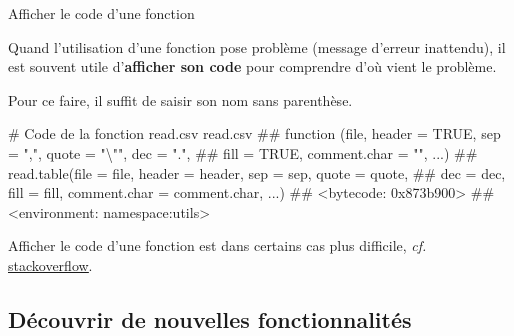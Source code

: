 \documentclass[12pt,handout,ignorenonframetext,]{beamer}
\newenvironment{Shaded}{}{}
\newcommand{\CommentTok}[1]{\textcolor[rgb]{0.00,0.50,0.00}{#1}}
\newcommand{\NormalTok}[1]{#1}
\renewenvironment{Shaded}{\begin{snugshade}}{\end{snugshade}}
\begin{document}
\begin{frame}[fragile]{Afficher le code d'une fonction}

Quand l'utilisation d'une fonction pose problème (message d'erreur
inattendu), il est souvent utile d'\textbf{afficher son code} pour
comprendre d'où vient le problème.

\pause Pour ce faire, il suffit de saisir son nom sans parenthèse.

\footnotesize

\begin{Shaded}
\begin{Highlighting}[]
\CommentTok{# Code de la fonction read.csv}
\NormalTok{read.csv}
\NormalTok{  ## function (file, header = TRUE, sep = ",", quote = "\textbackslash{}"", dec = ".", }
\NormalTok{  ##     fill = TRUE, comment.char = "", ...) }
\NormalTok{  ## read.table(file = file, header = header, sep = sep, quote = quote, }
\NormalTok{  ##     dec = dec, fill = fill, comment.char = comment.char, ...)}
\NormalTok{  ## <bytecode: 0x873b900>}
\NormalTok{  ## <environment: namespace:utils>}
\end{Highlighting}
\end{Shaded}

\pause \normalsize
Afficher le code d'une fonction est dans certains cas plus difficile,
\emph{cf.}
\href{http://stackoverflow.com/questions/19226816/how-can-i-view-the-source-code-for-a-function}{\underline{stackoverflow}}.

\end{frame}

\subsection{Découvrir de nouvelles
fonctionnalités}\label{decouvrir-de-nouvelles-fonctionnalites}
\end{document}
